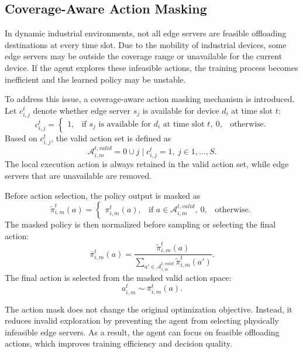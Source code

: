 \documentclass[conference]{IEEEtran}
\begin{document}
\subsection{Coverage-Aware Action Masking}

In dynamic industrial environments, not all edge servers are feasible offloading destinations at every time slot. Due to the mobility of industrial devices, some edge servers may be outside the coverage range or unavailable for the current device. If the agent explores these infeasible actions, the training process becomes inefficient and the learned policy may be unstable.

To address this issue, a coverage-aware action masking mechanism is introduced. Let $c_{i,j}^t$ denote whether edge server $s_j$ is available for device $d_i$ at time slot $t$:
\begin{equation}
c_{i,j}^t =
\begin{cases}
1, & \text{if } s_j \text{ is available for } d_i \text{ at time slot } t,\
0, & \text{otherwise}.
\end{cases}
\end{equation}
Based on $c_{i,j}^t$, the valid action set is defined as
\begin{equation}
\mathcal{A}_{i,m}^{t,valid}
=
{0}
\cup
{j \mid c_{i,j}^t=1,\ j\in{1,\ldots,S}}.
\end{equation}
The local execution action is always retained in the valid action set, while edge servers that are unavailable are removed.

Before action selection, the policy output is masked as
\begin{equation}
\tilde{\pi}_{i,m}^t(a)
=
\begin{cases}
\pi_{i,m}^t(a), & \text{if } a\in\mathcal{A}_{i,m}^{t,valid},\
0, & \text{otherwise}.
\end{cases}
\end{equation}
The masked policy is then normalized before sampling or selecting the final action:
\begin{equation}
\bar{\pi}_{i,m}^t(a)
=
\frac{
\tilde{\pi}_{i,m}^t(a)
}{
\sum_{a'\in\mathcal{A}_{i,m}^{t,valid}}
\tilde{\pi}_{i,m}^t(a')
}.
\end{equation}
The final action is selected from the masked valid action space:
\begin{equation}
a_{i,m}^t
\sim
\bar{\pi}_{i,m}^t(a).
\end{equation}

The action mask does not change the original optimization objective. Instead, it reduces invalid exploration by preventing the agent from selecting physically infeasible edge servers. As a result, the agent can focus on feasible offloading actions, which improves training efficiency and decision quality.
\end{document}
